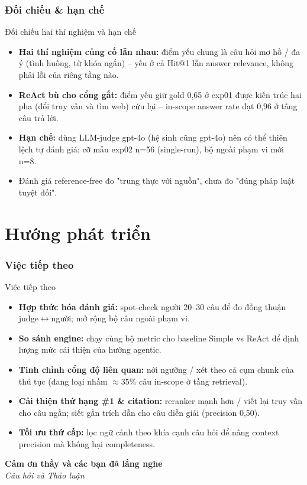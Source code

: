 \documentclass[9pt]{beamer}
\begin{document}
\section{Đối chiếu \& hạn chế}
\begin{frame}{Đối chiếu hai thí nghiệm và hạn chế}
  \begin{itemize}
    \item \textbf{Hai thí nghiệm củng cố lẫn nhau:} điểm yếu chung là câu hỏi mơ hồ / đa ý (tình huống, từ khóa ngắn) -- yếu ở cả Hit@1 lẫn answer relevance, không phải lỗi của riêng tầng nào.
    \item \textbf{ReAct bù cho cổng gắt:} điểm yếu giữ gold 0,65 ở exp01 được kiến trúc hai pha (đổi truy vấn và tìm web) cứu lại -- in-scope answer rate đạt 0,96 ở tầng câu trả lời.
    \item \textbf{Hạn chế:} dùng LLM-judge gpt-4o (hệ sinh cũng gpt-4o) nên có thể thiên lệch tự đánh giá; cỡ mẫu exp02 n=56 (single-run), bộ ngoài phạm vi mới n=8.
    \item Đánh giá reference-free đo "trung thực với nguồn", chưa đo "đúng pháp luật tuyệt đối".
  \end{itemize}
\end{frame}

\part{Hướng phát triển}

\section{Việc tiếp theo}
\begin{frame}{Việc tiếp theo}
  \begin{itemize}
    \item \textbf{Hợp thức hóa đánh giá:} spot-check người 20--30 câu để đo đồng thuận judge$\leftrightarrow$người; mở rộng bộ câu ngoài phạm vi.
    \item \textbf{So sánh engine:} chạy cùng bộ metric cho baseline Simple vs ReAct để định lượng mức cải thiện của hướng agentic.
    \item \textbf{Tinh chỉnh cổng độ liên quan:} nới ngưỡng / xét theo cả cụm chunk của thủ tục (đang loại nhầm $\approx$35\% câu in-scope ở tầng retrieval).
    \item \textbf{Cải thiện thứ hạng \#1 \& citation:} reranker mạnh hơn / viết lại truy vấn cho câu ngắn; siết gắn trích dẫn cho câu diễn giải (precision 0,50).
    \item \textbf{Tối ưu thứ cấp:} lọc ngữ cảnh theo khía cạnh câu hỏi để nâng context precision mà không hại completeness.
  \end{itemize}
\end{frame}

\begin{frame}
\begin{center}
\Huge
\textcolor{mainblue}{\textbf{Cảm ơn thầy và các bạn đã lắng nghe}}\\[1cm]
\large \textit{Câu hỏi và Thảo luận}
\end{center}
\end{frame}
\end{document}
